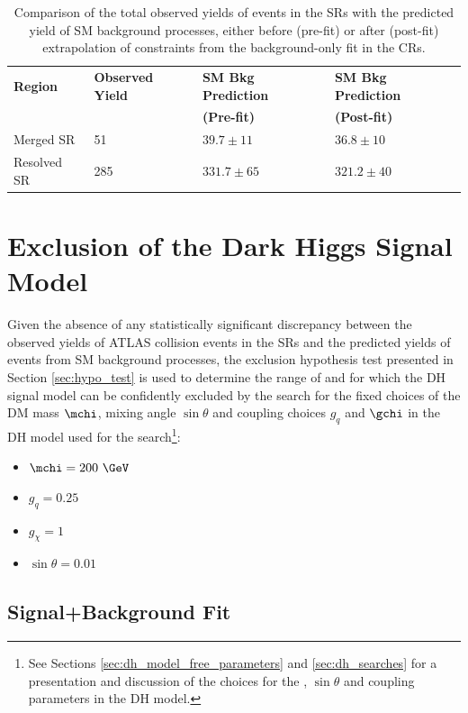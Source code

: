 \begin{table}
\centering
\caption{Comparison of the total observed yields of events in the SRs with the predicted yield of SM background processes, either before (pre-fit) or after (post-fit) extrapolation of constraints from the background-only fit in the CRs.}
\label{tab:pre_post_yields_SR}
\begin{tabular}{l l l l}
\toprule
\textbf{Region} & \textbf{Observed Yield} & \textbf{SM Bkg Prediction} & \textbf{SM Bkg Prediction} \\
 & & \textbf{(Pre-fit)} & \textbf{(Post-fit)} \\
\midrule
\midrule
Merged SR & 51 & $39.7 \pm 11$ & $36.8 \pm 10$ \\
\midrule
Resolved SR & 285 & $331.7\pm 65$ & $321.2 \pm 40$ \\
\bottomrule
\end{tabular}
\end{table}

\section{Exclusion of the Dark Higgs Signal Model}

Given the absence of any statistically significant discrepancy between the observed yields of ATLAS collision events in the SRs and the predicted yields of events from SM background processes, the exclusion hypothesis test presented in Section \ref{sec:hypo_test} is used to determine the range of \ms and \mZp for which the DH signal model can be confidently excluded by the search for the fixed choices of the DM mass \(\mchi\), mixing angle \(\sin\theta\) and coupling choices \(g_q\) and \(\gchi\) in the DH model used for the search\footnote{See Sections \ref{sec:dh_model_free_parameters} and \ref{sec:dh_searches} for a presentation and discussion of the choices for the \mchi, \(\sin\theta\) and coupling parameters in the DH model.}:

\begin{itemize}
\item \(\mchi=200~\GeV\)
\item \(g_q=0.25\)
\item \(g_\chi=1\)
\item \(\sin\theta=0.01\)
\end{itemize}

\subsection{Signal+Background Fit}

